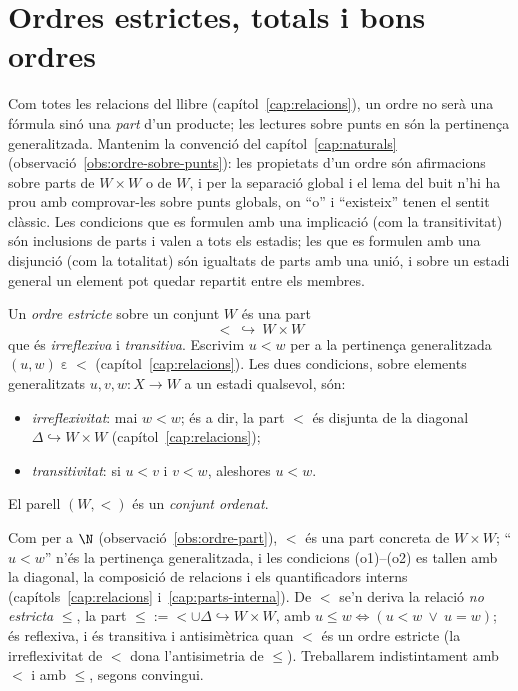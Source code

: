\section{Ordres estrictes, totals i bons ordres}\label{sec:ordres}

Com totes les relacions del llibre (capítol~\ref{cap:relacions}), un ordre
no serà una fórmula sinó una \emph{part} d'un producte; les lectures sobre
punts en són la pertinença generalitzada. Mantenim la convenció del
capítol~\ref{cap:naturals} (observació~\ref{obs:ordre-sobre-punts}): les
propietats d'un ordre són afirmacions sobre parts de \(W\times W\) o de
\(W\), i per la separació global i el lema del buit n'hi ha prou amb
comprovar-les sobre punts globals, on \enquote{o} i \enquote{existeix}
tenen el sentit clàssic. Les condicions que es formulen amb una implicació
(com la transitivitat) són inclusions de parts i valen a tots els estadis;
les que es formulen amb una disjunció (com la totalitat) són igualtats de
parts amb una unió, i sobre un estadi general un element pot quedar
repartit entre els membres.

\begin{definicio}\label{def:ordre-estricte}
Un \emph{ordre estricte} sobre un conjunt \(W\) és una part
\[
{<}\ \hookrightarrow\ W\times W
\]
que és \emph{irreflexiva} i \emph{transitiva}. Escrivim \(u<w\) per a la
pertinença generalitzada \((u,w)\mathrel{\varepsilon}{<}\)
(capítol~\ref{cap:relacions}). Les dues condicions, sobre elements
generalitzats \(u,v,w\colon X\to W\) a un estadi qualsevol, són:
\begin{itemize}
\item[(o1)] \emph{irreflexivitat}: mai \(w<w\); és a dir, la part \({<}\) és
disjunta de la diagonal \(\Delta\hookrightarrow W\times W\)
(capítol~\ref{cap:relacions});
\item[(o2)] \emph{transitivitat}: si \(u<v\) i \(v<w\), aleshores \(u<w\).
\end{itemize}
El parell \((W,<)\) és un \emph{conjunt ordenat}.
\end{definicio}

\begin{observacio}\label{obs:ordre-part-general}
Com per a \(\N\) (observació~\ref{obs:ordre-part}), \({<}\) és una part
concreta de \(W\times W\); \enquote{\(u<w\)} n'és la pertinença
generalitzada, i les condicions (o1)--(o2) es tallen amb la diagonal, la
composició de relacions i els quantificadors interns
(capítols~\ref{cap:relacions} i~\ref{cap:parts-interna}). De \({<}\) se'n
deriva la relació \emph{no estricta} \(\le\), la part
\({\le}:={<}\cup\Delta\hookrightarrow W\times W\), amb \(u\le w\Leftrightarrow
(u<w\ \vee\ u=w)\); és reflexiva, i és transitiva i antisimètrica quan
\({<}\) és un ordre estricte (la irreflexivitat de \({<}\) dona
l'antisimetria de \(\le\)). Treballarem indistintament amb \({<}\) i amb
\(\le\), segons convingui.
\end{observacio}


